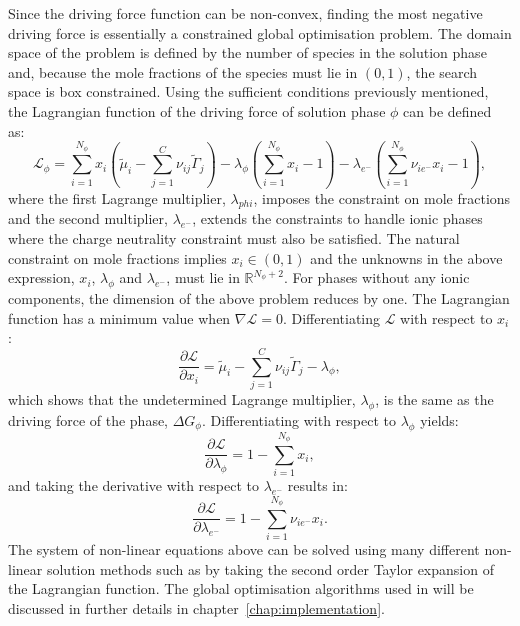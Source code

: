 Since the driving force function can be non-convex, finding the most negative driving force is essentially a constrained global optimisation problem. The domain space of  the problem is defined by the number of species in the solution phase and, because the mole fractions of the species must lie in $(0,1)$, the search space is box constrained. Using the sufficient conditions previously mentioned, the Lagrangian function of the driving force of solution phase $\phi$ can be defined as:
	\begin{equation}\label{eq:DrivingForceLagrangian}
		\mathcal{L}_\phi = \sum_{i=1}^{N_\phi} x_i \left(\tilde{\mu}_i - \sum_{j=1}^{C} \nu_{ij} \tilde{\Gamma}_j \right)
						 - \lambda_\phi \left( \sum_{i=1}^{N_\phi} x_i - 1 \right)
						 - \lambda_{e^-} \left( \sum_{i=1}^{N_\phi} \nu_{i {e^-}} x_i - 1 \right),
	\end{equation}
	where the first Lagrange multiplier, $\lambda_{phi}$, imposes the constraint on mole fractions and the second multiplier, $\lambda_{e^-}$, extends the constraints to handle ionic phases where the charge neutrality constraint must also be satisfied. The natural constraint on mole fractions implies $x_i \in (0, 1)$ and the  unknowns in the above expression, $x_i$, $\lambda_{\phi}$ and $\lambda_{e^-}$, must lie in $\mathbb{R}^{N_\phi + 2}$. For phases without any ionic components, the dimension of the above problem reduces by one.  The Lagrangian function has a minimum value when $\nabla \mathcal{L} = 0$. Differentiating $\mathcal{L}$ with respect to $x_i$:
	\begin{equation}
		\frac{\partial \mathcal{L}}{\partial x_i}	= \tilde{\mu}_i -  \sum_{j=1}^{C} \nu_{ij} \tilde{\Gamma}_j - \lambda_\phi,
	\end{equation}
	which shows that the undetermined Lagrange multiplier, $\lambda_\phi$, is the same as the driving force of the phase, $\Delta G_\phi$. Differentiating with respect to $\lambda_\phi$ yields:
	\begin{equation}
		\frac{\partial \mathcal{L}}{\partial \lambda_\phi}	= 1 - \sum_{i=1}^{N_\phi} x_i,
	\end{equation}
	and taking the derivative with respect to $\lambda_{e^-}$ results in:
	\begin{equation}
		\frac{\partial \mathcal{L}}{\partial \lambda_{e^-}}	= 1 - \sum_{i=1}^{N_\phi} \nu_{i {e^-}} x_i.
	\end{equation}
	The system of non-linear equations above can be solved using many different non-linear solution methods such as by taking the second order Taylor expansion of the Lagrangian function. The global optimisation algorithms used in {\GEM} will be discussed in further details in chapter~\ref{chap:implementation}.


